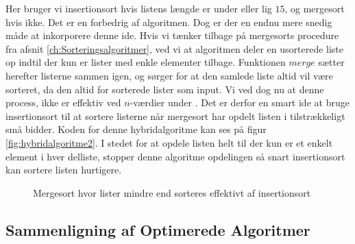 Her bruger vi insertionsort hvis listens længde er under eller lig $15$, og mergesort hvis ikke. Det er en forbedrig af algoritmen. Dog er der en endnu mere snedig måde at inkorporere denne ide. Hvis vi tænker tilbage på mergesorts procedure fra afsnit \ref{ch:Sorteringsalgoritmer}, ved vi at algoritmen deler en usorterede liste op indtil der kun er lister med enkle elementer tilbage. Funktionen $merge$ sætter herefter listerne sammen igen, og sørger for at den samlede liste altid vil være sorteret, da den altid for sorterede lister som input. Vi ved dog nu at denne process, ikke er effektiv ved $n$-værdier under . Det er derfor en smart ide at bruge insertionsort til at sortere listerne når mergesort har opdelt listen i tilstrækkeligt små bidder. Koden for denne hybridalgoritme kan ses på figur \ref{fig:hybridalgoritme2}. I stedet for at opdele listen helt til der kun er et enkelt element i hver delliste, stopper denne algoritme opdelingen så snart insertionsort kan sortere listen hurtigere.


\begin{figure}
	\begin{center}
		
	\end{center}
	\caption{Mergesort hvor lister mindre end  sorteres effektivt af insertionsort}
	\label{fig:hybridalgoritme}
\end{figure}







\subsection{Sammenligning af Optimerede Algoritmer}%
\label{sub:Sammenligning af Optimerede Algoritmer}


